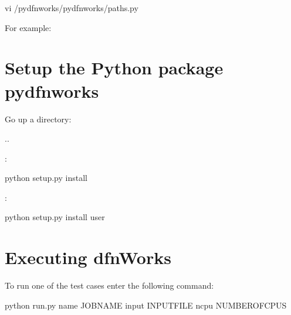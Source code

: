 \documentclass[letterpaper,10pt,english]{sphinxmanual}
\begin{document}
%
\begin{sphinxVerbatim}[commandchars=\\\{\}]
\PYGZdl{} vi /pydfnworks/pydfnworks/paths.py
\end{sphinxVerbatim}

For example:

%
\begin{sphinxVerbatim}[commandchars=\\\{\}]
\PYG{p}{[}\PYG{p}{]}  
\end{sphinxVerbatim}


\section{Setup the Python package pydfnworks}
\label{\detokenize{tutorial:setup-the-python-package-pydfnworks}}
Go up a directory:

%
\begin{sphinxVerbatim}[commandchars=\\\{\}]
\PYGZdl{}  ..
\end{sphinxVerbatim}

:

%
\begin{sphinxVerbatim}[commandchars=\\\{\}]
\PYGZdl{} python setup.py install
\end{sphinxVerbatim}

:

%
\begin{sphinxVerbatim}[commandchars=\\\{\}]
\PYGZdl{} python setup.py install \PYGZhy{}\PYGZhy{}user
\end{sphinxVerbatim}


\section{Executing dfnWorks}
\label{\detokenize{tutorial:executing-dfnworks}}
To run one of the test cases enter the following command:

%
\begin{sphinxVerbatim}[commandchars=\\\{\}]
\PYGZdl{} python run.py \PYGZhy{}name \PYG{o}{[}JOBNAME\PYG{o}{]} \PYGZhy{}input \PYG{o}{[}INPUT\PYGZus{}FILE\PYG{o}{]} \PYGZhy{}ncpu \PYG{o}{[}NUMBER\PYGZus{}OF\PYGZus{}CPUS\PYG{o}{]}
\end{sphinxVerbatim}
\end{document}
